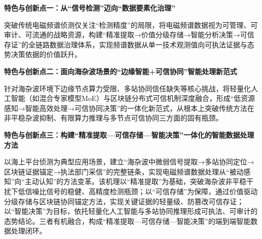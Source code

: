     \textbf{特色与创新点一：从“信号检测”迈向“数据要素化治理”}

突破传统电磁频谱侦测仅关注“检测精度”的局限，将电磁频谱数据视为可管理、可审计、可流通的战略资源，构建“精准提取→价值分级存储→智能分析决策→可信存证”的全链路数据治理体系，实现频谱数据从单一技术观测值向可执法证据与态势决策依据的价值跃升。

\textbf{特色与创新点二：面向海杂波场景的“边缘智能+可信协同”智能处理新范式}

针对海杂波环境下边缘节点算力受限、多站协同信任缺失等核心挑战，将轻量化人工智能（如混合专家模型MoE）与区块链分布式可信机制深度融合，形成“低资源感知→智能高效处理→可信协同决策”的一体化新范式，从根本上突破传统方法在非平稳杂波抑制、有限算力推理与多节点可信协同三方面的固有瓶颈。

    \textbf{特色与创新点三：构建“精准提取—可信存储—智能决策”一体化的智能数据处理方法}

以海上平台侦测为典型应用场景，建立“海杂波中微弱信号提取→多站协同定位→区块链证据锚定→执法部门采信”的完整链条，实现电磁频谱数据处理从“被动感知”向“主动认知”的方法变革。该机理以“精准提取”为基础，突破海杂波非平稳干扰下低信噪比信号的稳健、高精度检测瓶颈；以“可信存储”为保障，通过价值驱动分级存储与区块链协同锚定方法，实现关键证据的轻量级、防篡改可信存证；以“智能决策”为目标，依托轻量化人工智能与多站协同推理形成可执法、可审计的态势结论。三者有机融合，构成“精准提取—可信存储—智能决策”的端到端智能数据处理闭环。


